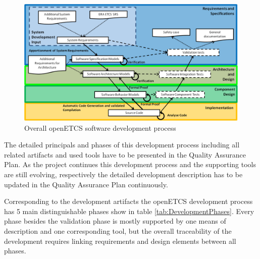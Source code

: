 \documentclass{template/openetcs_report}
\begin{document}
\begin{figure}[htbp]
\centering
\includegraphics[width=1.0\linewidth]{./images/openETCS-Software-Development_2-0}
\caption{Overall openETCS software development process}
\label{fig:DevopmentProcess}
\end{figure}

The detailed principals and phases of this development process including all related artifacts and used tools have to be presented in the Quality Assurance Plan.  As the project continues this development process and the supporting tools are still evolving, respectively the detailed development description has to be updated in the Quality Assurance Plan continuously.

Corresponding to the development artifacts the openETCS development process has 5 main distinguishable phases show in table \ref{tab:DevelopmentPhases}. Every phase besides the validation phase is mostly supported by one means of description and one corresponding tool, but the overall traceability of the development requires linking requirements and design elements between all phases. 
\end{document}
